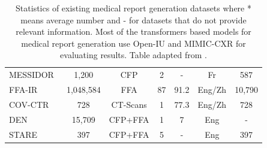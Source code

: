 \documentclass[10pt,journal,compsoc]{IEEEtran}
\begin{document}
\begin{table}[]
{\begin{tabular}{|l|ccc|ccc|}
MESSIDOR~\cite{decenciere2014feedback}                          & 1,200                      & CFP                          & 2                          & -                           & Fr                           & 587                        \\
FFA-IR\cite{li2021ffa}                            & 1,048,584                  & FFA                          & 87                         & 91.2                        & Eng/Zh                       & 10,790     
\\
COV-CTR~\cite{li2020auxiliary}                           & 728                        & CT-Scans                     & 1                          & 77.3                        & Eng/Zh                       & 728                        \\
DEN~\cite{huang2021deepopht}                               & 15,709                     & CFP+FFA                      & 1                          & 7                           & Eng                          & -                          \\
STARE~\cite{hoover2000locating}                             & 397                        & CFP+FFA                      & 5                          & -                           & Eng                          & 397                        \\ \hline
\end{tabular}%
}
\caption{Statistics of existing medical report generation datasets where * means average number and - for datasets that do not provide relevant information. Most of the transformers based models for medical report generation use Open-IU and MIMIC-CXR for evaluating results. Table adapted from \cite{li2021ffa}.}
\label{tab:rep_datasets}
\end{table}
\end{document}
